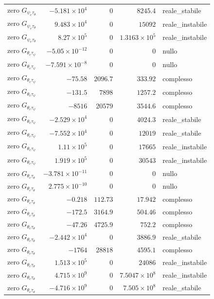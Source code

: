\documentclass[10pt,a4paper]{article}
\numberwithin{equation}{section}
\begin{document}
\begin{longtable}{lrrrl}
zero $G_{\psi_e\tau_\theta}$ & $-5.181\times10^{4}$ & $0$ & $8245.4$ & reale\_stabile \\
zero $G_{\psi_e\tau_\theta}$ & $9.483\times10^{4}$ & $0$ & $15092$ & reale\_instabile \\
zero $G_{\psi_e\tau_\theta}$ & $8.27\times10^{5}$ & $0$ & $1.3163\times10^{5}$ & reale\_instabile \\
\midrule
zero $G_{\theta_e\tau_\psi}$ & $-5.05\times10^{-12}$ & $0$ & $0$ & nullo \\
zero $G_{\theta_e\tau_\psi}$ & $-7.591\times10^{-8}$ & $0$ & $0$ & nullo \\
zero $G_{\theta_e\tau_\psi}$ & $-75.58$ & $2096.7$ & $333.92$ & complesso \\
zero $G_{\theta_e\tau_\psi}$ & $-131.5$ & $7898$ & $1257.2$ & complesso \\
zero $G_{\theta_e\tau_\psi}$ & $-8516$ & $20579$ & $3544.6$ & complesso \\
zero $G_{\theta_e\tau_\psi}$ & $-2.529\times10^{4}$ & $0$ & $4024.3$ & reale\_stabile \\
zero $G_{\theta_e\tau_\psi}$ & $-7.552\times10^{4}$ & $0$ & $12019$ & reale\_stabile \\
zero $G_{\theta_e\tau_\psi}$ & $1.11\times10^{5}$ & $0$ & $17665$ & reale\_instabile \\
zero $G_{\theta_e\tau_\psi}$ & $1.919\times10^{5}$ & $0$ & $30543$ & reale\_instabile \\
\midrule
zero $G_{\theta_e\tau_\theta}$ & $-3.781\times10^{-11}$ & $0$ & $0$ & nullo \\
zero $G_{\theta_e\tau_\theta}$ & $2.775\times10^{-10}$ & $0$ & $0$ & nullo \\
zero $G_{\theta_e\tau_\theta}$ & $-0.218$ & $112.73$ & $17.942$ & complesso \\
zero $G_{\theta_e\tau_\theta}$ & $-172.5$ & $3164.9$ & $504.46$ & complesso \\
zero $G_{\theta_e\tau_\theta}$ & $-47.26$ & $4725.9$ & $752.2$ & complesso \\
zero $G_{\theta_e\tau_\theta}$ & $-2.442\times10^{4}$ & $0$ & $3886.9$ & reale\_stabile \\
zero $G_{\theta_e\tau_\theta}$ & $-1764$ & $28818$ & $4595.1$ & complesso \\
zero $G_{\theta_e\tau_\theta}$ & $1.513\times10^{5}$ & $0$ & $24086$ & reale\_instabile \\
zero $G_{\theta_e\tau_\theta}$ & $4.715\times10^{9}$ & $0$ & $7.5047\times10^{8}$ & reale\_instabile \\
zero $G_{\theta_e\tau_\theta}$ & $-4.716\times10^{9}$ & $0$ & $7.505\times10^{8}$ & reale\_stabile \\
\bottomrule\end{longtable}
\end{document}
